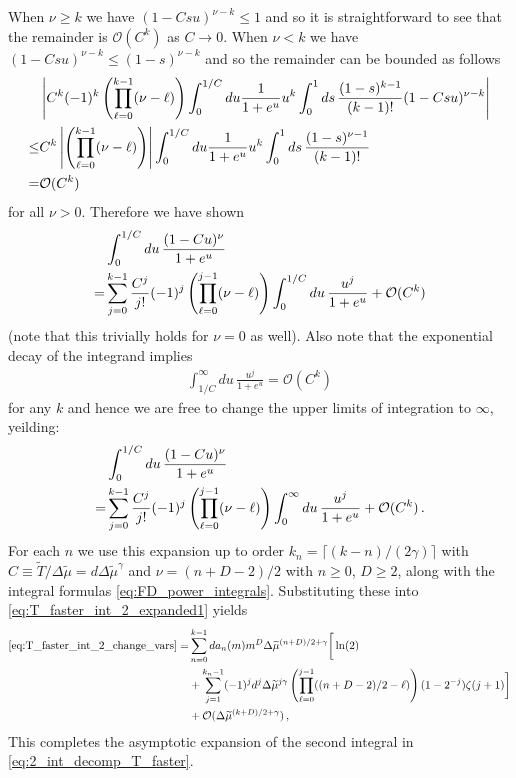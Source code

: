 \documentclass[sn-mathphys,Numbered]{sn-jnl}
\begin{document}
When $\nu\geq k$  we have $(1-Csu)^{\nu-k}\leq 1$ and so it is straightforward to see that the remainder is $\mathcal{O}(C^k)$ as $C\to 0$.  When $\nu<k$ we have $(1-Csu)^{\nu-k}\leq (1-s)^{\nu-k}$ and so the remainder can be bounded as follows
\begin{align}
&\left|C^k (-1)^k\left(\prod_{\ell=0}^{k-1}(\nu-\ell)\right)\int_0^{1/C} du \frac{1}{1+e^u} u^k\int_0^1ds\,\frac{(1-s)^{k-1}}{(k-1)!} (1-Csu)^{\nu-k}\right|\notag\\
\leq&C^k\left| \left(\prod_{\ell=0}^{k-1}(\nu-\ell)\right)\right|\int_0^{1/C} du \frac{1}{1+e^u} u^k\int_0^1ds\,\frac{(1-s)^{\nu-1}}{(k-1)!} \notag\\
=&\mathcal{O}(C^k)
\end{align}
for all  $\nu>0$. Therefore we have shown
\begin{align}
&\int_0^{1/C} du \,\frac{(1-Cu)^\nu}{1+e^u}\\
=&\sum_{j=0}^{k-1}\frac{C^j}{j!}(-1)^j\left(\prod_{\ell=0}^{j-1}(\nu-\ell) \right)\int_0^{1/C} du \,\frac{u^j}{1+e^u}  +\mathcal{O}(C^k)\notag
\end{align}
(note that this trivially holds for $\nu=0$ as well).   Also note that the exponential decay of the integrand implies 
\begin{align}
\int_{1/C}^\infty du\, \frac{u^j}{1+e^u}=\mathcal{O}(C^k)
\end{align} for any $k$ and hence we are free to change the upper limits of integration to $\infty$, yeilding:
\begin{align}
&\int_0^{1/C} du \,\frac{(1-Cu)^\nu}{1+e^u}\\
=&\sum_{j=0}^{k-1}\frac{C^j}{j!}(-1)^j\left(\prod_{\ell=0}^{j-1}(\nu-\ell) \right)\int_0^{\infty} du \,\frac{u^j}{1+e^u}  +\mathcal{O}(C^k)\,.\notag
\end{align}
For each $n$ we use this expansion up to order $k_n= \lceil(k-n)/(2\gamma)\rceil$ with $C\equiv \widetilde{T}/\Delta\widetilde{\mu}=d\Delta\widetilde{\mu}^{\gamma}$ and $\nu=(n+D-2)/2$ with $n\geq 0$, $D\geq 2$, along with the integral formulas 
\eqref{eq:FD_power_integrals}. Substituting  these into \eqref{eq:T_faster_int_2_expanded1} yields
\begin{align}    \label{eq:T_faster_int_2_expanded2}
    \eqref{eq:T_faster_int_2_change_vars} =&\sum_{n=0}^{k-1} da_n(m)m^{D}\Delta\widetilde{\mu}^{(n+D)/2+\gamma}\bigg[\ln(2)\\
    &+\sum_{j=1}^{k_n-1}(-1)^jd^j\Delta\widetilde{\mu}^{j\gamma}\left(\prod_{\ell=0}^{j-1}((n+D-2)/2-\ell) \right)(1-2^{-j})\zeta(j+1)  \bigg] \notag\\
    &+\mathcal{O}(\Delta\widetilde{\mu}^{(k+D)/2+\gamma})\notag\,,
\end{align}
This completes the asymptotic expansion of the second integral in  \eqref{eq:2_int_decomp_T_faster}.
\end{document}

